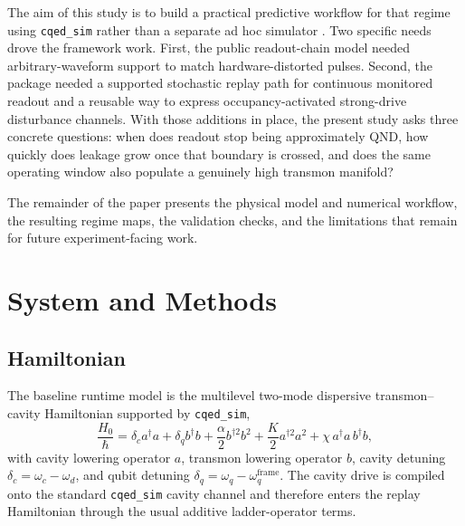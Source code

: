 \documentclass[11pt, a4paper]{article}
\begin{document}
The aim of this study is to build a practical predictive workflow for that regime using \texttt{cqed\_sim} rather than a separate ad hoc simulator \cite{cqedsim}. Two specific needs drove the framework work. First, the public readout-chain model needed arbitrary-waveform support to match hardware-distorted pulses. Second, the package needed a supported stochastic replay path for continuous monitored readout and a reusable way to express occupancy-activated strong-drive disturbance channels. With those additions in place, the present study asks three concrete questions: when does readout stop being approximately QND, how quickly does leakage grow once that boundary is crossed, and does the same operating window also populate a genuinely high transmon manifold?

The remainder of the paper presents the physical model and numerical workflow, the resulting regime maps, the validation checks, and the limitations that remain for future experiment-facing work.

\section{System and Methods}

\subsection{Hamiltonian}
The baseline runtime model is the multilevel two-mode dispersive transmon--cavity Hamiltonian supported by \texttt{cqed\_sim},
\begin{equation}
\frac{H_0}{\hbar}
=
\delta_c a^\dagger a
+ \delta_q b^\dagger b
+ \frac{\alpha}{2} b^{\dagger 2} b^2
+ \frac{K}{2} a^{\dagger 2} a^2
+ \chi\, a^\dagger a\, b^\dagger b,
\end{equation}
with cavity lowering operator $a$, transmon lowering operator $b$, cavity detuning
$\delta_c = \omega_c - \omega_d$, and qubit detuning
$\delta_q = \omega_q - \omega_q^{\mathrm{frame}}$.
The cavity drive is compiled onto the standard \texttt{cqed\_sim} cavity channel and therefore enters the replay Hamiltonian through the usual additive ladder-operator terms.
\end{document}

